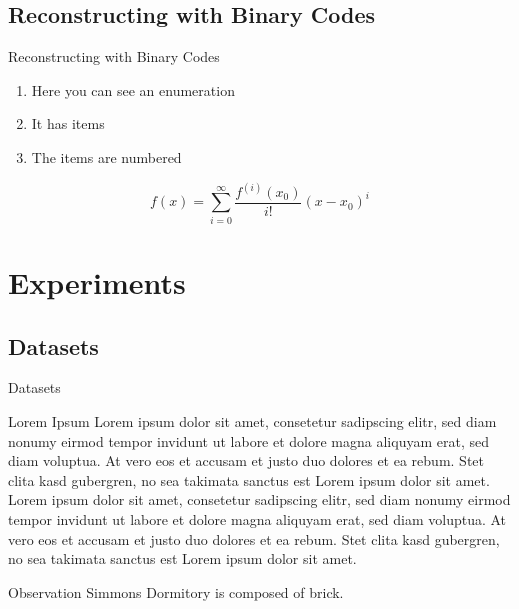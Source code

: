 \documentclass{beamer}
\begin{document}
\subsection{Reconstructing with Binary Codes}
\begin{frame}{Reconstructing with Binary Codes}
\begin{enumerate}
\item Here you can see an enumeration
\item It has items
\item The items are numbered
\end{enumerate}
\[
	f(x)=\sum_{i=0}^\infty \frac{f^{(i)}(x_0)}{i!}(x-x_0)^i
\]
\end{frame}


\section{Experiments}
\subsection{Datasets}
\begin{frame}{Datasets}
\begin{block}{Lorem Ipsum}
Lorem ipsum dolor sit amet, consetetur sadipscing elitr, sed diam nonumy eirmod tempor invidunt ut labore et dolore magna aliquyam erat, sed diam voluptua. 
At vero eos et accusam et justo duo dolores et ea rebum. Stet clita kasd gubergren, no sea takimata sanctus est Lorem ipsum dolor sit amet. 
Lorem ipsum dolor sit amet, consetetur sadipscing elitr, sed diam nonumy eirmod tempor invidunt ut labore et dolore magna aliquyam erat, sed diam voluptua. 
At vero eos et accusam et justo duo dolores et ea rebum. Stet clita kasd gubergren, no sea takimata sanctus est Lorem ipsum dolor sit amet.
\end{block}
\begin{block}{Observation}
Simmons Dormitory is composed of brick.
\end{block} 
\end{frame}
\end{document}
